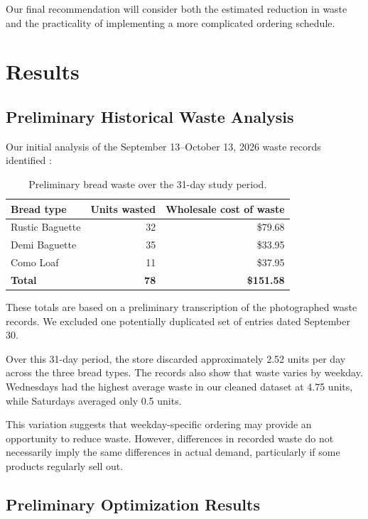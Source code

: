 \documentclass[11pt]{article}
\begin{document}
Our final recommendation will consider both the estimated reduction in waste and the practicality of implementing a more complicated ordering schedule.

\section{Results}

\subsection{Preliminary Historical Waste Analysis}

Our initial analysis of the September 13--October 13, 2026 waste records identified \cite{waste2026}:

\begin{table}[htbp]
\centering
\caption{Preliminary bread waste over the 31-day study period.}
\begin{tabular}{@{}lrr@{}}
\toprule
Bread type & Units wasted & Wholesale cost of waste \\
\midrule
Rustic Baguette & 32 & \$79.68 \\
Demi Baguette & 35 & \$33.95 \\
Como Loaf & 11 & \$37.95 \\
\midrule
\textbf{Total} & \textbf{78} & \textbf{\$151.58} \\
\bottomrule
\end{tabular}
\end{table}

These totals are based on a preliminary transcription of the photographed waste records. We excluded one potentially duplicated set of entries dated September 30.

Over this 31-day period, the store discarded approximately 2.52 units per day across the three bread types. The records also show that waste varies by weekday. Wednesdays had the highest average waste in our cleaned dataset at 4.75 units, while Saturdays averaged only 0.5 units.

This variation suggests that weekday-specific ordering may provide an opportunity to reduce waste. However, differences in recorded waste do not necessarily imply the same differences in actual demand, particularly if some products regularly sell out.

\subsection{Preliminary Optimization Results}
\end{document}

